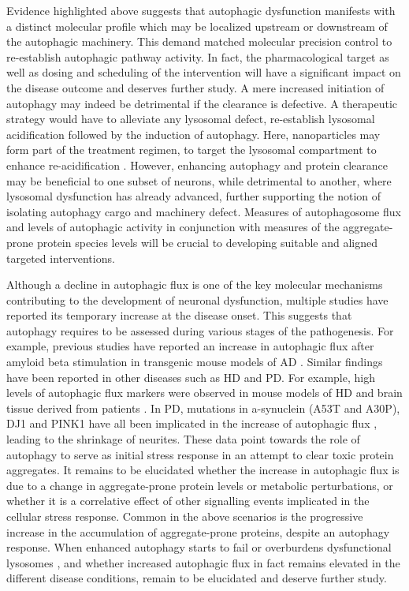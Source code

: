 Evidence highlighted above suggests that autophagic dysfunction manifests with a distinct molecular profile which may be localized upstream or downstream of the autophagic machinery. This demand matched molecular precision control to re-establish autophagic pathway activity. In fact, the pharmacological target as well as dosing and scheduling of the intervention will have a significant impact on the disease outcome and deserves further study. A mere increased initiation of autophagy may indeed be detrimental if the clearance is defective. A therapeutic strategy would have to alleviate any lysosomal defect, re-establish lysosomal acidification followed by the induction of autophagy. Here, nanoparticles may form part of the treatment regimen, to target the lysosomal compartment to enhance re-acidification \citep{Peynshaert2014}. However, enhancing autophagy and protein clearance may be beneficial to one subset of neurons, while detrimental to another, where lysosomal dysfunction has already advanced, further supporting the notion of isolating autophagy cargo and machinery defect. Measures of autophagosome flux \citep{loos2014} and levels of autophagic activity \citep{Kaizuka2016} in conjunction with measures of the aggregate-prone protein species levels will be crucial to developing suitable and aligned targeted interventions.

Although a decline in autophagic flux is one of the key molecular mechanisms contributing to the development of neuronal dysfunction, multiple studies have reported its temporary increase at the disease onset. This suggests that autophagy requires to be assessed during various stages of the pathogenesis. For example, previous studies have reported an increase in autophagic flux after amyloid beta stimulation in transgenic mouse models of AD \citep{Hung2009,Wang2010a,Wang2010b,Yu2005}. Similar findings have been reported in other diseases such as HD and PD. For example, high levels of autophagic flux markers were observed in mouse models of HD and brain tissue derived from patients \citep{Heng2010,Nagata2004,Ravikumar2004}. In PD, mutations in a-synuclein (A53T and A30P), DJ1 and PINK1 have all been implicated in the increase of autophagic flux \citep{Irrcher2010,Michiorri2010,Plowey2008,Stefanis2001}, leading to the shrinkage of neurites. These data point towards the role of autophagy to serve as initial stress response \citep{Loos2009} in an attempt to clear toxic protein aggregates. It remains to be elucidated whether the increase in autophagic flux is due to a change in aggregate-prone protein levels or metabolic perturbations, or whether it is a correlative effect of other signalling events implicated in the cellular stress response. Common in the above scenarios is the progressive increase in the accumulation of aggregate-prone proteins, despite an autophagy response. When enhanced autophagy starts to fail or overburdens dysfunctional lysosomes \citep{Bordi2016}, and whether increased autophagic flux in fact remains elevated in the different disease conditions, remain to be elucidated and deserve further study.

